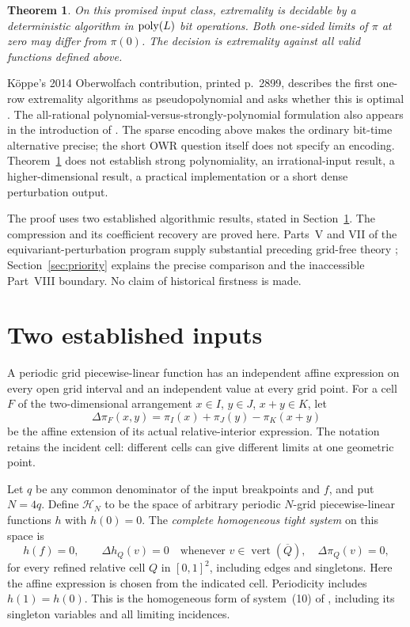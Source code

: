 \documentclass[11pt]{article}
\newtheorem{theorem}{Theorem}[section]
\newcommand{\Del}{\Delta}\newcommand{\rank}{\operatorname{rank}}
\begin{document}
\begin{theorem}\label{thm:main}
On this promised input class, extremality is decidable by a deterministic algorithm in $\operatorname{poly}(L)$ bit operations. Both one-sided limits of $\pi$ at zero may differ from $\pi(0)$. The decision is extremality against all valid functions defined above.
\end{theorem}

K\"oppe's 2014 Oberwolfach contribution, printed p.~2899, describes the first one-row extremality algorithms as pseudopolynomial and asks whether this is optimal \cite{OWR}. The all-rational polynomial-versus-strongly-polynomial formulation also appears in the introduction of \cite{BHK}. The sparse encoding above makes the ordinary bit-time alternative precise; the short OWR question itself does not specify an encoding. Theorem~\ref{thm:main} does not establish strong polynomiality, an irrational-input result, a higher-dimensional result, a practical implementation or a short dense perturbation output.

The proof uses two established algorithmic results, stated in Section~\ref{sec:imports}. The compression and its coefficient recovery are proved here. Parts~V and VII of the equivariant-perturbation program supply substantial preceding grid-free theory \cite{PartV,PartVII}; Section~\ref{sec:priority} explains the precise comparison and the inaccessible Part~VIII boundary. No claim of historical firstness is made.

\section{Two established inputs}\label{sec:imports}
A periodic grid piecewise-linear function has an independent affine expression on every open grid interval and an independent value at every grid point. For a cell $F$ of the two-dimensional arrangement $x\in I$, $y\in J$, $x+y\in K$, let
\[
 \Del\pi_F(x,y)=\pi_I(x)+\pi_J(y)-\pi_K(x+y)
\]
be the affine extension of its actual relative-interior expression. The notation retains the incident cell: different cells can give different limits at one geometric point.

Let $q$ be any common denominator of the input breakpoints and $f$, and put $N=4q$. Define $\mathcal H_N$ to be the space of arbitrary periodic $N$-grid piecewise-linear functions $h$ with $h(0)=0$. The \emph{complete homogeneous tight system} on this space is
\begin{equation}\label{eq:full}
 h(f)=0,\qquad
 \Del h_Q(v)=0\quad\text{whenever }v\in\operatorname{vert}(\overline Q),\quad
 \Del\pi_Q(v)=0,
\end{equation}
for every refined relative cell $Q$ in $[0,1]^2$, including edges and singletons. Here the affine expression is chosen from the indicated cell. Periodicity includes $h(1)=h(0)$. This is the homogeneous form of system~(10) of \cite{BHK}, including its singleton variables and all limiting incidences.
\end{document}
